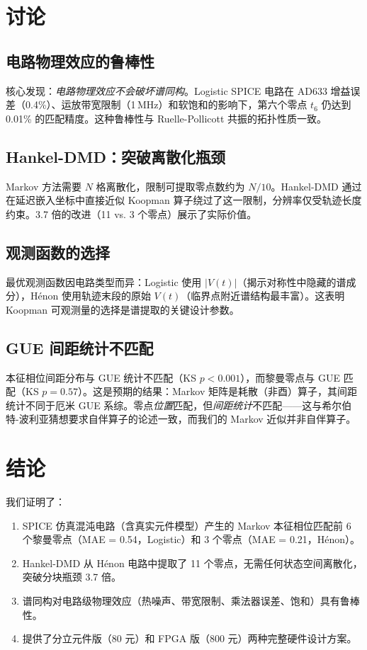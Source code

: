 \documentclass[twocolumn]{article}
\begin{document}
\section{讨论}

\subsection{电路物理效应的鲁棒性}

核心发现：\emph{电路物理效应不会破坏谱同构}。Logistic SPICE 电路在 AD633 增益误差（0.4\%）、运放带宽限制（1\,MHz）和软饱和的影响下，第六个零点 $t_6$ 仍达到 0.01\% 的匹配精度。这种鲁棒性与 Ruelle-Pollicott 共振的拓扑性质一致。

\subsection{Hankel-DMD：突破离散化瓶颈}

Markov 方法需要 $N$ 格离散化，限制可提取零点数约为 $N/10$。Hankel-DMD 通过在延迟嵌入坐标中直接近似 Koopman 算子绕过了这一限制，分辨率仅受轨迹长度约束。3.7 倍的改进（11 vs. 3 个零点）展示了实际价值。

\subsection{观测函数的选择}

最优观测函数因电路类型而异：Logistic 使用 $|V(t)|$（揭示对称性中隐藏的谱成分），H\'enon 使用轨迹末段的原始 $V(t)$（临界点附近谱结构最丰富）。这表明 Koopman 可观测量的选择是谱提取的关键设计参数。

\subsection{GUE 间距统计不匹配}

本征相位间距分布与 GUE 统计不匹配（KS $p < 0.001$），而黎曼零点与 GUE 匹配（KS $p = 0.57$）。这是预期的结果：Markov 矩阵是耗散（非酉）算子，其间距统计不同于厄米 GUE 系综。零点\emph{位置}匹配，但\emph{间距统计}不匹配——这与希尔伯特-波利亚猜想要求自伴算子的论述一致，而我们的 Markov 近似并非自伴算子。

\section{结论}

我们证明了：
\begin{enumerate}
\item SPICE 仿真混沌电路（含真实元件模型）产生的 Markov 本征相位匹配前 6 个黎曼零点（MAE = 0.54，Logistic）和 3 个零点（MAE = 0.21，H\'enon）。
\item Hankel-DMD 从 H\'enon 电路中提取了 11 个零点，无需任何状态空间离散化，突破分块瓶颈 3.7 倍。
\item 谱同构对电路级物理效应（热噪声、带宽限制、乘法器误差、饱和）具有鲁棒性。
\item 提供了分立元件版（80 元）和 FPGA 版（800 元）两种完整硬件设计方案。
\end{enumerate}
\end{document}
